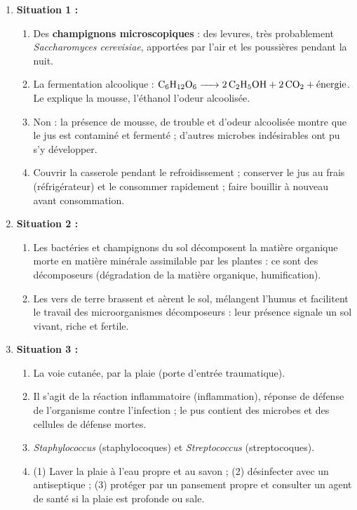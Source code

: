 \documentclass[11pt]{article}
\newcommand{\cle}[1]{{\popxbold\color{popdark}#1}}
\begin{document}
\begin{corrige}
\begin{enumerate}
\item \textbf{Situation 1 :}
      \begin{enumerate}
      \item Des \textbf{champignons microscopiques} : des levures, très probablement \emph{Saccharomyces cerevisiae}, apportées par l'air et les poussières pendant la nuit.
      \item La \cle{fermentation alcoolique} : $\ce{C6H12O6 -> 2 C2H5OH + 2 CO2} + \text{énergie}$. Le  explique la mousse, l'éthanol l'odeur alcoolisée.
      \item Non : la présence de mousse, de trouble et d'odeur alcoolisée montre que le jus est contaminé et fermenté ; d'autres microbes indésirables ont pu s'y développer.
      \item Couvrir la casserole pendant le refroidissement ; conserver le jus au frais (réfrigérateur) et le consommer rapidement ; faire bouillir à nouveau avant consommation.
      \end{enumerate}
\item \textbf{Situation 2 :}
      \begin{enumerate}
      \item Les bactéries et champignons du sol décomposent la matière organique morte en matière minérale assimilable par les plantes : ce sont des \cle{décomposeurs} (dégradation de la matière organique, humification).
      \item Les vers de terre brassent et aèrent le sol, mélangent l'humus et facilitent le travail des microorganismes décomposeurs : leur présence signale un sol vivant, riche et fertile.
      \end{enumerate}
\item \textbf{Situation 3 :}
      \begin{enumerate}
      \item La \cle{voie cutanée}, par la plaie (porte d'entrée traumatique).
      \item Il s'agit de la \cle{réaction inflammatoire} (inflammation), réponse de défense de l'organisme contre l'infection ; le pus contient des microbes et des cellules de défense mortes.
      \item \emph{Staphylococcus} (staphylocoques) et \emph{Streptococcus} (streptocoques).
      \item (1) Laver la plaie à l'eau propre et au savon ; (2) désinfecter avec un antiseptique ; (3) protéger par un pansement propre et consulter un agent de santé si la plaie est profonde ou sale.

\end{enumerate}
\end{enumerate}
\end{corrige}
\end{document}
